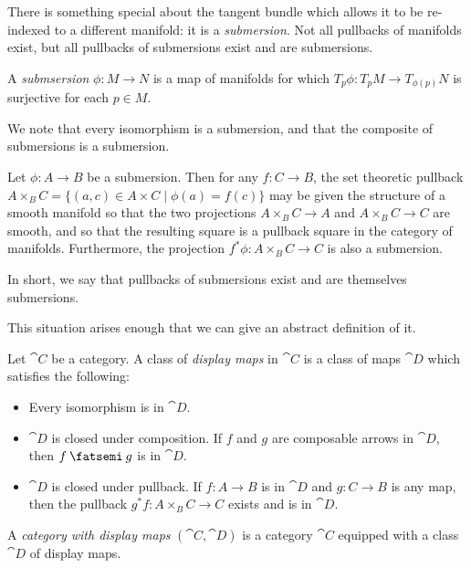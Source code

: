 \documentclass[DynamicalBook]{subfiles}
\begin{document}
There is something special about the tangent bundle which allows it to be
re-indexed to a different manifold: it is a \emph{submersion}. Not all pullbacks
of manifolds exist, but all pullbacks of submersions exist and are submersions.
\begin{definition}
  A \emph{submsersion} $\phi : M \to N$ is a map of manifolds for which $T_p\phi
  : T_p M \to T_{\phi(p)} N$ is surjective for each $p \in M$.

  We note that every isomorphism is a submersion, and that the composite of
  submersions is a submersion.
\end{definition}

\begin{lemma}\label{lem.submersion_closed_pullback}
 Let $\phi : A \to B$ be a submersion. Then for any $f : C \to B$, the set
 theoretic pullback $A \times_B C = \{(a, c) \in A \times C \mid \phi(a) =
 f(c)\}$ may be given the structure of a smooth manifold so that the two
 projections $A \times_B C \to A$ and $A \times_B C \to C$ are smooth, and so
 that the resulting square is a pullback square in the category of manifolds.
 Furthermore, the projection $ f^{\ast}\phi : A \times_B C \to C$ is also a submersion.
 
 In short, we say that pullbacks of submersions exist and are themselves submersions.
\end{lemma}

This situation arises enough that we can give an abstract definition of it. 
\begin{definition}
Let $\cat{C}$ be a category. A class of \emph{display maps} in
$\cat{C}$ is a class of maps $\cat{D}$ which satisfies the following: 
\begin{itemize}
  \item Every isomorphism is in $\cat{D}$.
  \item $\cat{D}$ is closed under composition. If $f$ and $g$ are composable arrows in $\cat{D}$, then $f \then g$ is
    in $\cat{D}$.
  \item $\cat{D}$ is closed under pullback. If $f : A \to B$ is in $\cat{D}$ and
    $g : C \to B$ is any map, then the pullback $g^{\ast} f : A \times_B C \to
    C$ exists and is in $\cat{D}$.
\end{itemize}
A \emph{category with display maps} $(\cat{C}, \cat{D})$ is a category $\cat{C}$ equipped with a
class $\cat{D}$ of display maps.
\end{definition}
\end{document}
